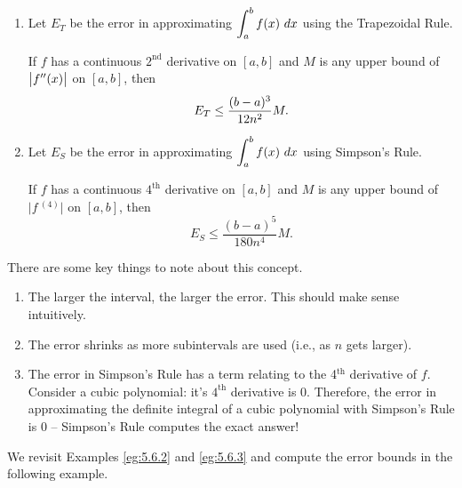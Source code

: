 {\begin{enumerate}[1)]
\item	Let $E_T$ be the error in approximating $\displaystyle \int_a^b f(x)\ dx$ using the Trapezoidal Rule. 

If $f$ has a continuous $2^\text{nd}$ derivative on $[a,b]$ and $M$ is any upper bound of $\big|f''(x)\big|$ on $[a,b]$, then
$$\displaystyle E_T \leq \frac{(b-a)^3}{12n^2}M.$$

\item	Let $E_S$ be the error in approximating $\displaystyle \int_a^b f(x)\ dx$ using Simpson's Rule. 

If $f$ has a continuous $4^\text{th}$ derivative on $[a,b]$ and $M$ is any upper bound of $\big|f\,^{(4)}\big|$ on $[a,b]$, then
$$E_S \leq \frac{(b-a)^5}{180n^4}M.$$
\end{enumerate}
} %

There are some key things to note about this concept.
\begin{enumerate}[1)]
	\item		The larger the interval, the larger the error. This should make sense intuitively.
	\item		The error shrinks as more subintervals are used (i.e., as $n$ gets larger).  
	\item		The error in Simpson's Rule has a term relating to the 4$^{\text{th}}$ derivative of $f$. Consider a cubic polynomial: it's $4^{\text{th}}$ derivative is $0$. Therefore, the error in approximating the definite integral of a cubic polynomial with Simpson's Rule is $0$ -- Simpson's Rule computes the exact answer!
\end{enumerate}

We revisit Examples \ref{eg:5.6.2} and \ref{eg:5.6.3} and compute the error bounds in the following example.

 
